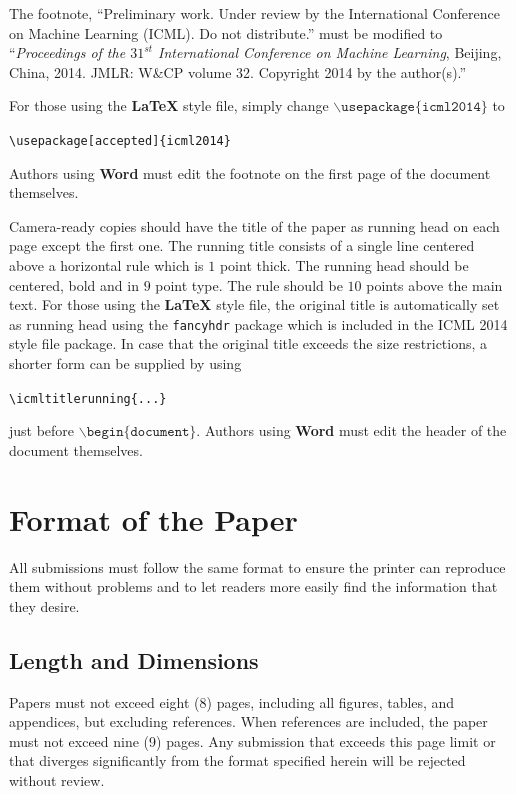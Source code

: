 \documentclass{article}
\begin{document}
The footnote, ``Preliminary work.  Under review by the International
Conference on Machine Learning (ICML).  Do not distribute.'' must be
modified to ``\textit{Proceedings of the
$\mathit{31}^{st}$ International Conference on Machine Learning},
Beijing, China, 2014.  JMLR: W\&CP volume 32. 
Copyright 2014 by the author(s).''

For those using the \textbf{\LaTeX} style file, simply change
$\mathtt{\backslash usepackage\{icml2014\}}$ to 

\verb|\usepackage[accepted]{icml2014}|

\noindent
Authors using \textbf{Word} must edit the
footnote on the first page of the document themselves.

Camera-ready copies should have the title of the paper as running head
on each page except the first one.  The running title consists of a
single line centered above a horizontal rule which is $1$ point thick.
The running head should be centered, bold and in $9$ point type.  The
rule should be $10$ points above the main text.  For those using the
\textbf{\LaTeX} style file, the original title is automatically set as running
head using the {\tt fancyhdr} package which is included in the ICML
2014 style file package.  In case that the original title exceeds the
size restrictions, a shorter form can be supplied by using

\verb|\icmltitlerunning{...}|

just before $\mathtt{\backslash begin\{document\}}$.
Authors using \textbf{Word} must edit the header of the document themselves.

\section{Format of the Paper} 
 
All submissions must follow the same format to ensure the printer can
reproduce them without problems and to let readers more easily find
the information that they desire.

\subsection{Length and Dimensions}

Papers must not exceed eight (8) pages, including all figures, tables,
and appendices, but excluding references. When references are included,
the paper must not exceed nine (9) pages. Any submission that exceeds 
this page limit or that diverges significantly from the format specified 
herein will be rejected without review.
\end{document}
